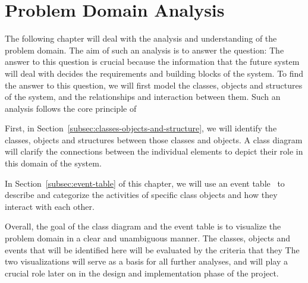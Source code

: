 \section{Problem Domain Analysis}\label{sec:problem-domain-analysis}

The following chapter will deal with the analysis and understanding of the problem domain.
The aim of such an analysis is to answer the question:
The answer to this question is crucial because the information that the future system will deal with decides the
requirements and building blocks of the system.
To find the answer to this question, we will first model the classes, objects and structures of the system, and the
relationships and interaction between them.
Such an analysis follows the core principle of

First, in Section~\ref{subsec:classes-objects-and-structure}, we will identify the classes, objects and structures between
those classes and objects.
A class diagram will clarify the connections between the individual elements to depict their role in this domain of the
system.

In Section~\ref{subsec:event-table} of this chapter, we will use an event table~\cite[52]{mathiassen2018} to describe and
categorize the activities of specific class objects and how they interact with each other.

Overall, the goal of the class diagram and the event table is to visualize the problem domain in a clear and unambiguous
manner.
The classes, objects and events that will be identified here will be evaluated by the criteria that they
The two visualizations will serve as a basis for all further analyses, and will play a crucial role later on in the
design and implementation phase of the project.



